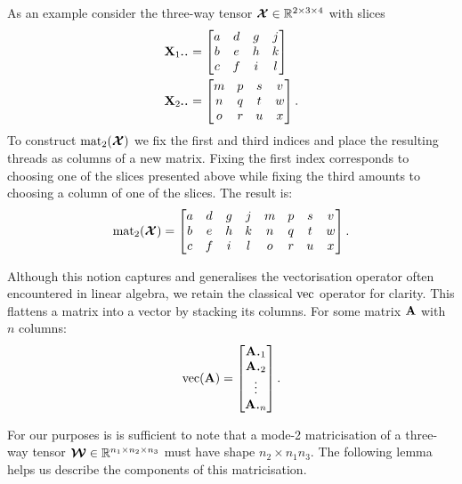 As an example consider the three-way tensor \(\bm{\mathcal{X}} \in \mathbb{R}^{2 \times 3 \times 4}\)
with slices
\begin{align} \label{eq:slicies}
	\mat{X}_{1 \midbullet \midbullet} &= \begin{bmatrix}
		a & d & g & j \\
		b & e & h & k \\
		c & f & i & l \\
	\end{bmatrix} \\
	\mat{X}_{2 \midbullet \midbullet} &= \begin{bmatrix}
		m & p & s & v \\
		n & q & t & w \\
		o & r & u & x \\
	\end{bmatrix}.
\end{align} To construct \(\operatorname{mat}_2(\bm{\mathcal{X}})\) we fix the first and third indices and place the
resulting threads as columns of a new matrix. Fixing the first index corresponds to choosing one of
the slices presented above while fixing the third amounts to choosing a column of one of the slices.
The result is:
\begin{equation}\label{eq:matricisedeg}
	\operatorname{mat}_2(\bm{\mathcal{X}}) = \begin{bmatrix}
		a & d & g & j & m & p & s & v \\
		b & e & h & k & n & q & t & w \\
		c & f & i & l & o & r & u & x
	\end{bmatrix}.
\end{equation}

Although this notion captures and generalises the vectorisation operator often
encountered in linear algebra, we retain the classical \(\operatorname{vec}\) operator for clarity.
This flattens a matrix into a vector by stacking its columns. For some matrix \(\mathbf{A}\) with
\(n\) columns:
\begin{equation}\label{eq:vec}
	\vect(\mat{A}) = \begin{bmatrix}
		\vec{A}_{\midbullet 1}\\
		\vec{A}_{\midbullet 2}\\
		\vdots\\
		\vec{A}_{\midbullet n}
	\end{bmatrix}.
\end{equation}

For our purposes is is sufficient to note that a 
mode-2 matricisation of a
three-way tensor \(\bm{\mathcal{W}} \in \mathbb{R}^{n_1\times n_2\times n_3}\) must have shape
\(n_2 \times n_1n_3\). The following lemma helps us describe the components of this matricisation.

